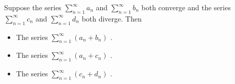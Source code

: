 \documentclass{ximera}
\begin{document}
\begin{example}
Suppose the series $\displaystyle \sum_{n=1}^\infty a_n$ and $\displaystyle \sum_{n=1}^\infty b_n$ both converge and the series $\displaystyle \sum_{n=1}^\infty c_n$ and $\displaystyle \sum_{n=1}^\infty d_n$ both diverge. Then
\begin{itemize}
\item The series $\displaystyle \sum_{n=1}^\infty (a_n + b_n)$ .
\item The series $\displaystyle \sum_{n=1}^\infty (a_n + c_n)$ .
\item The series $\displaystyle \sum_{n=1}^\infty (c_n + d_n)$ .
\end{itemize}
\end{example}
\end{document}
